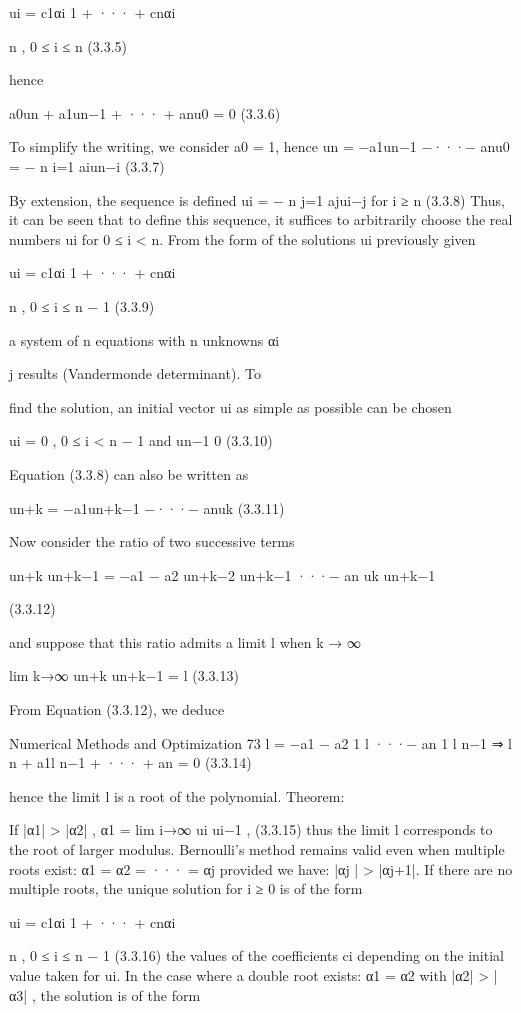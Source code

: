\documentclass[letterpaper,12pt]{article}
\begin{document}
ui = c1αi
1 + ··· + cnαi

n , 0 ≤ i ≤ n (3.3.5)

hence

a0un + a1un−1 + ··· + anu0 = 0 (3.3.6)

To simplify the writing, we consider a0 = 1, hence
un = −a1un−1 −···− anu0 = −
n
i=1
aiun−i (3.3.7)

By extension, the sequence is defined
ui = −
n
j=1
ajui−j for i ≥ n (3.3.8)
Thus, it can be seen that to define this sequence, it suffices to arbitrarily choose the
real numbers ui for 0 ≤ i < n. From the form of the solutions ui previously given

ui = c1αi
1 + ··· + cnαi

n , 0 ≤ i ≤ n − 1 (3.3.9)

a system of n equations with n unknowns αi

j results (Vandermonde determinant). To

find the solution, an initial vector ui as simple as possible can be chosen

ui = 0 , 0 ≤ i < n − 1 and un−1  0 (3.3.10)

Equation (3.3.8) can also be written as

un+k = −a1un+k−1 −···− anuk (3.3.11)

Now consider the ratio of two successive terms

un+k
un+k−1
= −a1 − a2
un+k−2
un+k−1
···− an
uk
un+k−1

(3.3.12)

and suppose that this ratio admits a limit l when k → ∞

lim
k→∞
un+k
un+k−1
= l (3.3.13)

From Equation (3.3.12), we deduce

Numerical Methods and Optimization 73
l = −a1 − a2
1
l ···− an
1
l
n−1 ⇒ l
n + a1l
n−1 + ··· + an = 0 (3.3.14)

hence the limit l is a root of the polynomial.
Theorem:

If |α1| > |α2| , α1 = lim
i→∞
ui
ui−1
, (3.3.15)
thus the limit l corresponds to the root of larger modulus. Bernoulli’s method remains
valid even when multiple roots exist: α1 = α2 = ··· = αj provided we have: |αj | >
|αj+1|.
If there are no multiple roots, the unique solution for i ≥ 0 is of the form

ui = c1αi
1 + ··· + cnαi

n , 0 ≤ i ≤ n − 1 (3.3.16)
the values of the coefficients ci depending on the initial value taken for ui.
In the case where a double root exists: α1 = α2 with |α2| > |α3| , the solution is of
the form
\end{document}
